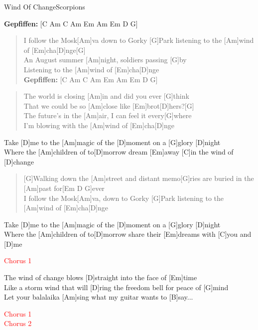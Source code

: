 \begin{song}{Wind Of Change}{Scorpions}
    \begin{intro}
	    \textbf{Gepfiffen:} [C Am C Am Em Am Em D G]
    \end{intro}

    \begin{verse}  
        I follow the Mosk[Am]va down to Gorky [G]Park listening to the [Am]wind of [Em]cha[D]nge[G] \\

        An August summer [Am]night, soldiers passing [G]by \\
        Listening to the [Am]wind of [Em]cha[D]nge \\
        \textbf{Gepfiffen:} [C Am C Am Em Am Em D G]
    \end{verse}  

    \begin{verse}  
        The world is closing [Am]in and did you ever [G]think \\
        That we could be so [Am]close like [Em]brot[D]hers?[G] \\
        The future's in the [Am]air, I can feel it every[G]where \\
        I'm blowing with the [Am]wind of [Em]cha[D]nge
    \end{verse}  

    \begin{chorus} %
        [G]Take [D]me to the [Am]magic of the [D]moment on a [G]glory [D]night \\
        Where the [Am]children of to[D]morrow dream [Em]away [C]in the wind of [D]change
    \end{chorus}

    \begin{verse}  
        [G]Walking down the [Am]street and distant memo[G]ries are buried in the [Am]past for[Em D G]ever \\
        I follow the Mosk[Am]va, down to Gorky [G]Park listening to the [Am]wind of [Em]cha[D]nge
    \end{verse}  

    \begin{chorus} %
        [G]Take [D]me to the [Am]magic of the [D]moment on a [G]glory [D]night \\
        Where the [Am]children of to[D]morrow share their [Em]dreams with [C]you and [D]me \\
    \end{chorus}

    \textcolor{red}{Chorus 1}

    \begin{bridge}
        [Em]The wind of change blows [D]straight into the face of [Em]time \\
        Like a storm wind that will [D]ring the freedom bell for peace of [G]mind \\
        Let your balalaika [Am]sing what my guitar wants to [B]say... 
    \end{bridge}

    \textcolor{red}{Chorus 1} \\
    \textcolor{red}{Chorus 2}

\end{song}
